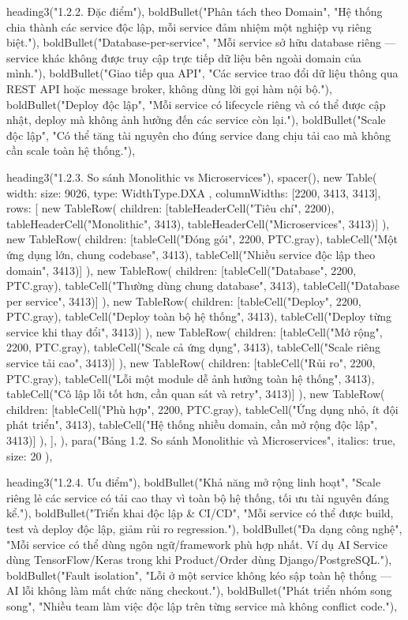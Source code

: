  heading3("1.2.2. Đặc điểm"),
  boldBullet("Phân tách theo Domain", "Hệ thống chia thành các service độc lập, mỗi service đảm nhiệm một nghiệp vụ riêng biệt."),
  boldBullet("Database-per-service", "Mỗi service sở hữu database riêng — service khác không được truy cập trực tiếp dữ liệu bên ngoài domain của mình."),
  boldBullet("Giao tiếp qua API", "Các service trao đổi dữ liệu thông qua REST API hoặc message broker, không dùng lời gọi hàm nội bộ."),
  boldBullet("Deploy độc lập", "Mỗi service có lifecycle riêng và có thể được cập nhật, deploy mà không ảnh hưởng đến các service còn lại."),
  boldBullet("Scale độc lập", "Có thể tăng tài nguyên cho đúng service đang chịu tải cao mà không cần scale toàn hệ thống."),

  heading3("1.2.3. So sánh Monolithic vs Microservices"),
  spacer(),
  new Table({
    width: { size: 9026, type: WidthType.DXA },
    columnWidths: [2200, 3413, 3413],
    rows: [
      new TableRow({ children: [tableHeaderCell("Tiêu chí", 2200), tableHeaderCell("Monolithic", 3413), tableHeaderCell("Microservices", 3413)] }),
      new TableRow({ children: [tableCell("Đóng gói", 2200, PTC.gray), tableCell("Một ứng dụng lớn, chung codebase", 3413), tableCell("Nhiều service độc lập theo domain", 3413)] }),
      new TableRow({ children: [tableCell("Database", 2200, PTC.gray), tableCell("Thường dùng chung database", 3413), tableCell("Database per service", 3413)] }),
      new TableRow({ children: [tableCell("Deploy", 2200, PTC.gray), tableCell("Deploy toàn bộ hệ thống", 3413), tableCell("Deploy từng service khi thay đổi", 3413)] }),
      new TableRow({ children: [tableCell("Mở rộng", 2200, PTC.gray), tableCell("Scale cả ứng dụng", 3413), tableCell("Scale riêng service tải cao", 3413)] }),
      new TableRow({ children: [tableCell("Rủi ro", 2200, PTC.gray), tableCell("Lỗi một module dễ ảnh hưởng toàn hệ thống", 3413), tableCell("Cô lập lỗi tốt hơn, cần quan sát và retry", 3413)] }),
      new TableRow({ children: [tableCell("Phù hợp", 2200, PTC.gray), tableCell("Ứng dụng nhỏ, ít đội phát triển", 3413), tableCell("Hệ thống nhiều domain, cần mở rộng độc lập", 3413)] }),
    ],
  }),
  para("Bảng 1.2. So sánh Monolithic và Microservices", { italics: true, size: 20 }),

  heading3("1.2.4. Ưu điểm"),
  boldBullet("Khả năng mở rộng linh hoạt", "Scale riêng lẻ các service có tải cao thay vì toàn bộ hệ thống, tối ưu tài nguyên đáng kể."),
  boldBullet("Triển khai độc lập & CI/CD", "Mỗi service có thể được build, test và deploy độc lập, giảm rủi ro regression."),
  boldBullet("Đa dạng công nghệ", "Mỗi service có thể dùng ngôn ngữ/framework phù hợp nhất. Ví dụ AI Service dùng TensorFlow/Keras trong khi Product/Order dùng Django/PostgreSQL."),
  boldBullet("Fault isolation", "Lỗi ở một service không kéo sập toàn hệ thống — AI lỗi không làm mất chức năng checkout."),
  boldBullet("Phát triển nhóm song song", "Nhiều team làm việc độc lập trên từng service mà không conflict code."),

